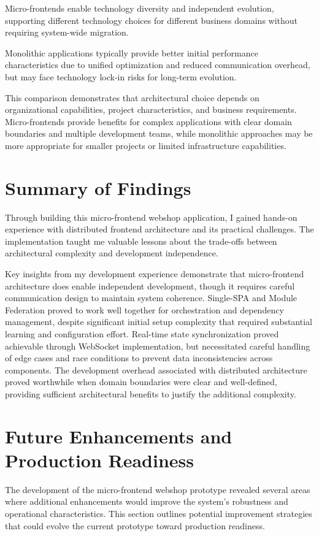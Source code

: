 \documentclass[12pt,a4paper]{report}
\begin{document}
Micro-frontends enable technology diversity and independent evolution, supporting different technology choices for different business domains without requiring system-wide migration.

Monolithic applications typically provide better initial performance characteristics due to unified optimization and reduced communication overhead, but may face technology lock-in risks for long-term evolution.

This comparison demonstrates that architectural choice depends on organizational capabilities, project characteristics, and business requirements. Micro-frontends provide benefits for complex applications with clear domain boundaries and multiple development teams, while monolithic approaches may be more appropriate for smaller projects or limited infrastructure capabilities.

\section{Summary of Findings}

Through building this micro-frontend webshop application, I gained hands-on experience with distributed frontend architecture and its practical challenges. The implementation taught me valuable lessons about the trade-offs between architectural complexity and development independence.

Key insights from my development experience demonstrate that micro-frontend architecture does enable independent development, though it requires careful communication design to maintain system coherence. Single-SPA and Module Federation proved to work well together for orchestration and dependency management, despite significant initial setup complexity that required substantial learning and configuration effort. Real-time state synchronization proved achievable through WebSocket implementation, but necessitated careful handling of edge cases and race conditions to prevent data inconsistencies across components. The development overhead associated with distributed architecture proved worthwhile when domain boundaries were clear and well-defined, providing sufficient architectural benefits to justify the additional complexity.

\section{Future Enhancements and Production Readiness}

The development of the micro-frontend webshop prototype revealed several areas where additional enhancements would improve the system's robustness and operational characteristics. This section outlines potential improvement strategies that could evolve the current prototype toward production readiness.
\end{document}

